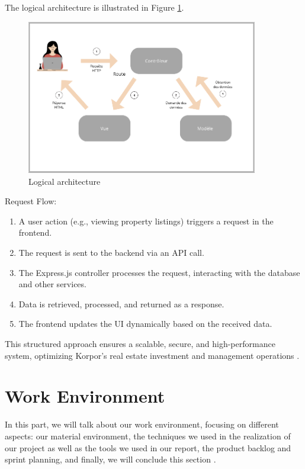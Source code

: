 The logical architecture is illustrated in Figure \ref{fig:logical-architecture}.

\begin{figure}[htbp]
    \centering
    \includegraphics[width=0.9\textwidth]{images/logique.png}
    \caption{Logical architecture}
    \label{fig:logical-architecture}
\end{figure}

Request Flow:
\begin{enumerate}
    \item A user action (e.g., viewing property listings) triggers a request in the frontend.
    \item The request is sent to the backend via an API call.
    \item The Express.js controller processes the request, interacting with the database and other services.
    \item Data is retrieved, processed, and returned as a response.
    \item The frontend updates the UI dynamically based on the received data.
\end{enumerate}

This structured approach ensures a scalable, secure, and high-performance system, optimizing Korpor's real estate investment and management operations \cite{KimDevOpsMethods2018}.

\section{Work Environment}

In this part, we will talk about our work environment, focusing on different aspects:
our material environment, the techniques we used in the realization of our project as well as the tools we used in our report, the product backlog and sprint planning, and finally, we will conclude this section \cite{BeckXP2004, MartinCleanArchitecture2017}.

